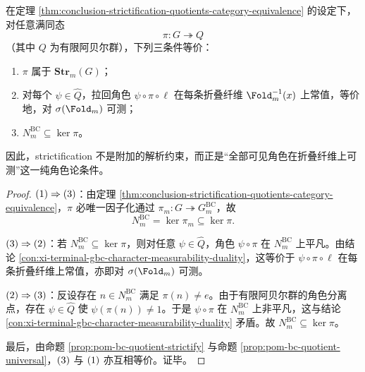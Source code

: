 \begin{theorem}\label{thm:conclusion-strictification-character-measurability-rigidity}
在定理 \ref{thm:conclusion-strictification-quotients-category-equivalence} 的设定下，对任意满同态
\[
\pi:G\twoheadrightarrow Q
\]
（其中 \(Q\) 为有限阿贝尔群），下列三条件等价：
\begin{enumerate}
  \item \(\pi\) 属于 \(\mathbf{Str}_m(G)\)；
  \item 对每个 \(\psi\in\widehat Q\)，拉回角色 \(\psi\circ\pi\circ\ell\) 在每条折叠纤维 \(\Fold_m^{-1}(x)\) 上常值，等价地，对 \(\sigma(\Fold_m)\) 可测；
  \item \(N_m^{\mathrm{BC}}\subseteq \ker\pi\)。
\end{enumerate}
因此，strictification 不是附加的解析约束，而正是“全部可见角色在折叠纤维上可测”这一纯角色论条件。
\end{theorem}
\begin{proof}
\(\textup{(1)}\Rightarrow\textup{(3)}\)：由定理 \ref{thm:conclusion-strictification-quotients-category-equivalence}，\(\pi\) 必唯一因子化通过 \(\pi_m:G\twoheadrightarrow G_m^{\mathrm{BC}}\)，故
\[
N_m^{\mathrm{BC}}=\ker\pi_m\subseteq \ker\pi.
\]

\(\textup{(3)}\Rightarrow\textup{(2)}\)：若 \(N_m^{\mathrm{BC}}\subseteq \ker\pi\)，则对任意 \(\psi\in\widehat Q\)，角色 \(\psi\circ\pi\) 在 \(N_m^{\mathrm{BC}}\) 上平凡。由结论 \ref{con:xi-terminal-gbc-character-measurability-duality}，这等价于 \(\psi\circ\pi\circ\ell\) 在每条折叠纤维上常值，亦即对 \(\sigma(\Fold_m)\) 可测。

\(\textup{(2)}\Rightarrow\textup{(3)}\)：反设存在 \(n\in N_m^{\mathrm{BC}}\) 满足 \(\pi(n)\neq e\)。由于有限阿贝尔群的角色分离点，存在 \(\psi\in\widehat Q\) 使 \(\psi(\pi(n))\neq 1\)。于是 \(\psi\circ\pi\) 在 \(N_m^{\mathrm{BC}}\) 上非平凡，这与结论 \ref{con:xi-terminal-gbc-character-measurability-duality} 矛盾。故 \(N_m^{\mathrm{BC}}\subseteq \ker\pi\)。

最后，由命题 \ref{prop:pom-bc-quotient-strictify} 与命题 \ref{prop:pom-bc-quotient-universal}，\(\textup{(3)}\) 与 \(\textup{(1)}\) 亦互相等价。证毕。
\end{proof}

